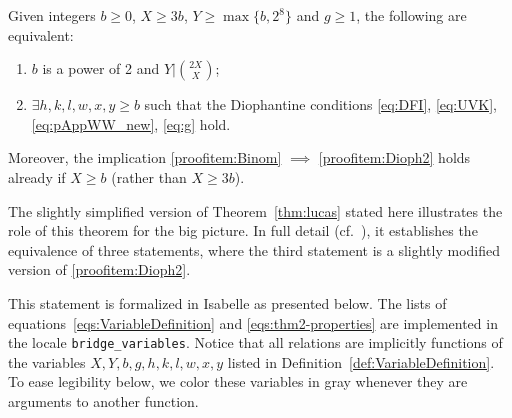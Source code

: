 \documentclass[a4paper,USenglish,cleveref,autoref,thm-restate]{lipics-v2021}
\newcommand{\bLowercase}{\mathfrak{b}}
\begin{document}
\begin{theorem} \label{thm:lucas}
Given integers $b\ge 0$, $X\geq 3b$, $Y\geq \max \{ b,2^8 \}$ and $g\ge 1$, the following are equivalent:
\begin{enumerate}
\item \label{proofitem:Binom} $b$ is a power of 2 and $Y | \binom{2 X}{X}$;
\item \label{proofitem:Dioph2} $\exists h,k,l,w,x,y\geq b$ such that the Diophantine conditions \eqref{eq:DFI}, \eqref{eq:UVK}, \eqref{eq:pAppWW_new}, \eqref{eq:g} hold.
\end{enumerate}
Moreover, the implication \eqref{proofitem:Binom} $\implies$ \eqref{proofitem:Dioph2} holds already if $X\ge b$ (rather than $X\ge 3b$).
\end{theorem}

\begin{remark}
    The slightly simplified version of Theorem~\ref{thm:lucas} stated here illustrates the role of this theorem for the big picture. In full detail (cf.~\cite[Theorem~2]{manuscript}), it establishes the equivalence of three statements, where the third statement is a slightly modified version of \cref{proofitem:Dioph2}. 
\end{remark}


This statement is formalized in Isabelle as presented below. The lists of equations~\eqref{eqs:VariableDefinition} and \eqref{eqs:thm2-properties} are implemented in the locale \texttt{bridge\_variables}. Notice that all relations are implicitly functions of the variables $X,Y,b,g,h,k,l,w,x,y$ listed in Definition~\ref{def:VariableDefinition}. To ease legibility below, we color these variables in gray whenever they are arguments to another function.
\end{document}
